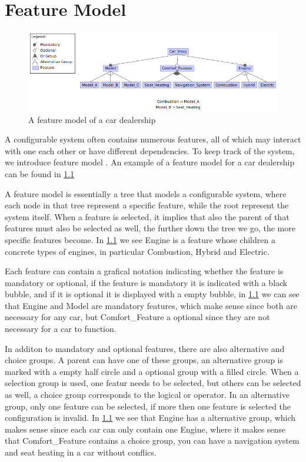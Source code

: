 \chapter{Feature Model}\label{ch:Feature Model}

\begin{figure}[h]
    \centering
    \includegraphics[scale=0.6]{gfx/Car_Shop.png}
    \caption{A feature model of a car dealership}
    \label{fig:car}
\end{figure}

A configurable system often contains numerous features, all of which may interact with one each other or have different dependencies.
To keep track of the system, we introduce feature model \cite{Feature-Oriented-Software-Product-Lines-Feature-models}. An example
of a feature model for a car dealership can be found in \ref{fig:car}

A feature model is essentially a tree that models a configurable system, where each node in that tree represent a specific feature, while the root
represent the system itself. When a feature is selected, it implies that also the parent of that features must also be selected as well, the further
down the tree we go, the more specific features become. In \ref{fig:car} we see Engine is a feature whose children a concrete types
of engines, in particular Combustion, Hybrid and Electric.

Each feature can contain a grafical notation indicating whether the feature is mandatory or optional, if the feature is mandatory it is 
indicated with a black bubble, and if it is optional it is displayed with a empty bubble, in \ref{fig:car} we can see that Engine and
Model are mandatory features, which make sense since both are necessary for any car, but Comfort\_Feature a optional since they are not
necessary for a car to function.

In additon to mandatory and optional features, there are also alternative and choice groups. A parent can have one of these groups, an alternative group
is marked with a empty half circle and a optional group with a filled circle. When a selection group is used, one featur needs to be selected, but
others can be selected as well, a choice group corresponds to the logical or operator. In an alternative group, only one feature can be
selected, if more then one feature is selected the configuration is invalid. In \ref{fig:car} we see that Engine has a alternative group, which makes sense
since each car can only contain one Engine, where it makes sense that Comfort\_Feature contains a choice group, you can have a navigation system
and seat heating in a car without conflics.

